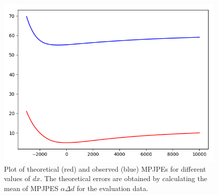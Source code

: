 \begin{figure}
	\centering
	\includegraphics[scale=0.5]{figures/plot_e_03_07_original_z_offset.png}
	\caption{Plot of theoretical (red) and observed (blue) MPJPEs for different values of $dx$. 
		The theoretical errors are obtained by calculating the mean of MPJPES $\alpha \Delta d$ for the evaluation data.}
	\label{fig:z-shift-error}
\end{figure}